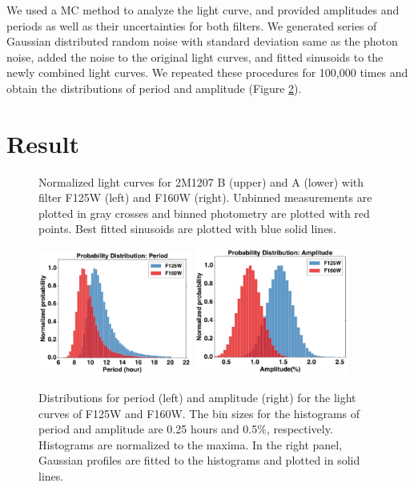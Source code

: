 \documentclass[apj]{emulateapj}
\begin{document}
We used a MC method to analyze the light curve, and provided amplitudes
and periods as well as their uncertainties for both filters. We
generated series of Gaussian distributed random noise with standard deviation
same as the photon noise, added the noise to the original light curves, and
fitted sinusoids to the newly combined light curves. We repeated these
procedures  for 100,000 times and obtain the distributions of period
and amplitude (Figure \ref{fig:4}).


\section{Result}
\label{Results}

  \begin{figure}
  \centering
  \caption{Normalized light curves for 2M1207 B (upper) and A (lower)
    with filter F125W (left) and F160W (right). Unbinned
  measurements are plotted in gray crosses and binned photometry are
  plotted with red points. Best fitted sinusoids are plotted
  with blue solid lines.}
  \label{fig:3}
\end{figure}

\begin{figure}
  \centering
  \includegraphics[width=0.45\textwidth]{periodDistr}
  \includegraphics[width=0.45\textwidth]{amplitudeDistr}
  \caption{Distributions for period (left) and amplitude (right) for the light
    curves of F125W and F160W. The bin sizes for the histograms of
    period  and amplitude are
  0.25 hours and 0.5\%, respectively. Histograms are
  normalized to the maxima. In the right panel, Gaussian profiles are fitted to the
  histograms and plotted in solid lines.}
  \label{fig:4}
\end{figure}
\end{document}
